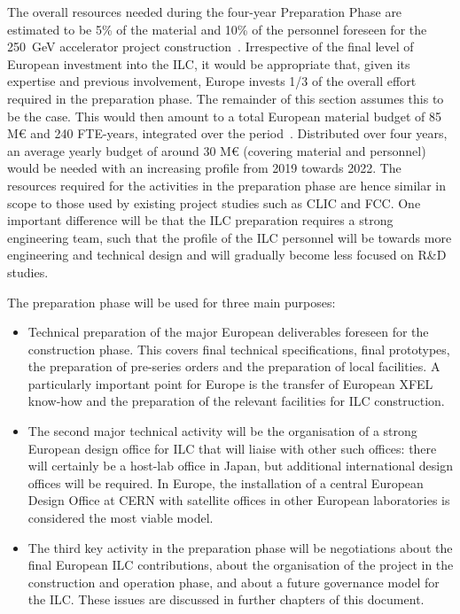 \documentclass[%
 reprint,
 floatfix,
 amsmath,amssymb,
 aps,
]{revtex4-1}
\begin{document}
The overall resources needed during the four-year Preparation Phase are estimated to be 5\% of the material and 10\% of the personnel 
foreseen for the 250~GeV accelerator project construction~\cite{Evans:2017rvt}. Irrespective of the final level of European investment into the ILC,
it would be appropriate that, given its expertise and previous involvement, Europe invests 1/3 of the overall effort required in the 
preparation phase. The remainder of this section assumes this to be the case. This would then amount to a total European material 
budget of 85 M\euro{} and 240 FTE-years, integrated over the period~\cite{ejade-report}.
Distributed over four years, an average yearly budget of around 30 M\euro{} (covering material and personnel) would be needed with an 
increasing profile from 2019 towards 2022. The resources required for the activities in the preparation phase are hence similar in 
scope to those used by existing project studies such as CLIC and FCC. One important difference will be that the ILC preparation 
requires a strong engineering team, such that the profile of the ILC personnel will be towards more engineering and technical 
design and will gradually become less focused on R\&D studies.

The preparation phase will be used for three main purposes:

\begin{itemize}
\item 
Technical preparation of the major European deliverables foreseen for the construction phase. 
This covers final technical specifications, final prototypes, the preparation of pre-series orders and the preparation of local 
facilities. A particularly important point for Europe is the transfer of European XFEL know-how and the preparation of the 
relevant facilities for ILC construction.
\item
The second major technical activity will be the organisation of a strong European design office for ILC that will liaise with 
other such offices: there will certainly be a host-lab office in Japan, but additional international design offices will be 
required. In Europe, the installation of a central European Design Office at CERN with satellite offices in other European laboratories is considered the most viable model.
\item 
The third key activity in the preparation phase will be negotiations about the final European ILC contributions, about the 
organisation of the project in the construction and operation phase, and about a future governance model for the ILC. 
These issues are discussed in further chapters of this document.
\end{itemize}
\end{document}
